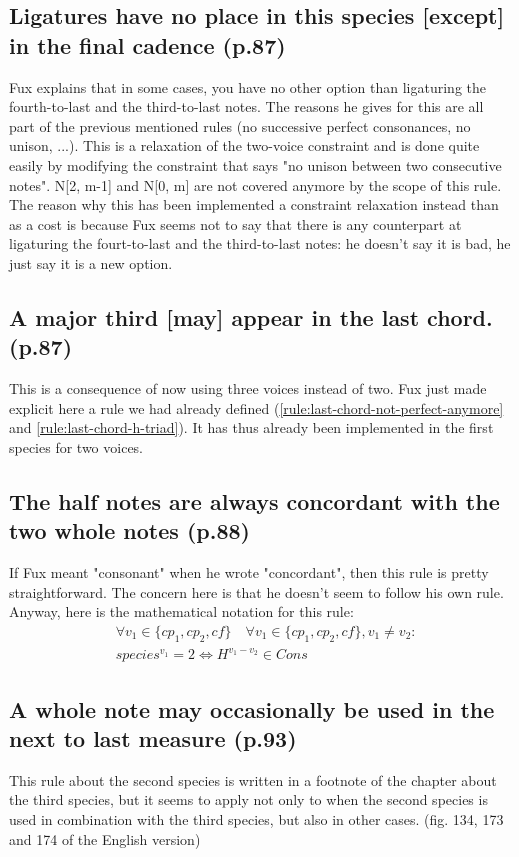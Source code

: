 \subsection{Ligatures have no place in this species [except] in the final cadence (p.87)}
Fux explains that in some cases, you have no other option than ligaturing the fourth-to-last and the third-to-last notes. The reasons he gives for this are all part of the previous mentioned rules (no successive perfect consonances, no unison, ...).
This is a relaxation of the two-voice constraint and is done quite easily by modifying the constraint that says "no unison between two consecutive notes". N[2, m-1] and N[0, m] are  not covered anymore by the scope of this rule. The reason why this has been implemented a constraint relaxation instead than as a cost is because Fux seems not to say that there is any counterpart at ligaturing the fourt-to-last and the third-to-last notes: he doesn't say it is bad, he just say it is a new option.

\subsection{A major third [may] appear in the last chord. (p.87)}
This is a consequence of now using three voices instead of two. Fux just made explicit here a rule we had already defined (\ref{rule:last-chord-not-perfect-anymore} and \ref{rule:last-chord-h-triad}). It has thus already been implemented in the first species for two voices.

\subsection{The half notes are always concordant with the two whole notes (p.88)}
If Fux meant "consonant" when he wrote "concordant", then this rule is pretty straightforward. The concern here is that he doesn't seem to follow his own rule. Anyway, here is the mathematical notation for this rule:
\begin{equation} \begin{aligned}
    &\forall v_1 \in \{cp_1, cp_2, cf\} \quad \forall v_1 \in \{cp_1, cp_2, cf\}, v_1 \neq v_2 \colon\\
    &species^{v_1} = 2 \iff H^{v_1-v_2} \in Cons
\end{aligned} \end{equation}

\subsection{A whole note may occasionally be used in the next to last measure (p.93)}
This rule about the second species is written in a footnote of the chapter about the third species, but it seems to apply not only to when the second species is used in combination with the third species, but also in other cases. (fig. 134, 173 and 174 of the English version)

